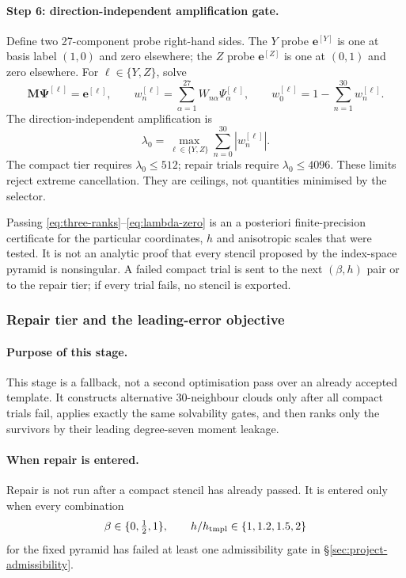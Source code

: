 \documentclass[11pt,a4paper]{article}
\begin{document}
\paragraph{Step 6: direction-independent amplification gate.}
Define two 27-component probe right-hand sides. The $Y$ probe
$\bm e^{[Y]}$ is one at basis label $(1,0)$ and zero elsewhere; the $Z$ probe
$\bm e^{[Z]}$ is one at $(0,1)$ and zero elsewhere. For
$\ell\in\{Y,Z\}$, solve
\begin{equation}
 \bm M\bm\Psi^{[\ell]}=\bm e^{[\ell]},\qquad
 w_n^{[\ell]}=\sum_{\alpha=1}^{27}
 W_{n\alpha}\Psi_\alpha^{[\ell]},\qquad
 w_0^{[\ell]}=1-\sum_{n=1}^{30}w_n^{[\ell]}.
\label{eq:project-probe-weights}
\end{equation}
The direction-independent amplification is
\begin{equation}
 \lambda_0=
 \max_{\ell\in\{Y,Z\}}\sum_{n=0}^{30}|w_n^{[\ell]}|.
\label{eq:lambda-zero}
\end{equation}
The compact tier requires $\lambda_0\le512$; repair trials require
$\lambda_0\le4096$. These limits reject extreme cancellation. They are ceilings, not
quantities minimised by the selector.

Passing \eqref{eq:three-ranks}--\eqref{eq:lambda-zero} is an a posteriori
finite-precision certificate for the particular coordinates, $h$ and anisotropic scales
that were tested. It is not an analytic proof that every stencil proposed by the
index-space pyramid is nonsingular. A failed compact trial is sent to the next
$(\beta,h)$ pair or to the repair tier; if every trial fails, no stencil is exported.

\subsubsection{Repair tier and the leading-error objective}
\label{sec:project-repair-tier}

\paragraph{Purpose of this stage.}
This stage is a fallback, not a second optimisation pass over an already accepted
template. It constructs alternative 30-neighbour clouds only after all compact trials
fail, applies exactly the same solvability gates, and then ranks only the survivors by
their leading degree-seven moment leakage.

\paragraph{When repair is entered.}
Repair is not run after a compact stencil has already passed. It is entered only when
every combination
\[
 \beta\in\{0,\tfrac12,1\},\qquad
 h/h_{\rm tmpl}\in\{1,1.2,1.5,2\}
\]
for the fixed pyramid has failed at least one admissibility gate in
\S\ref{sec:project-admissibility}.
\end{document}
